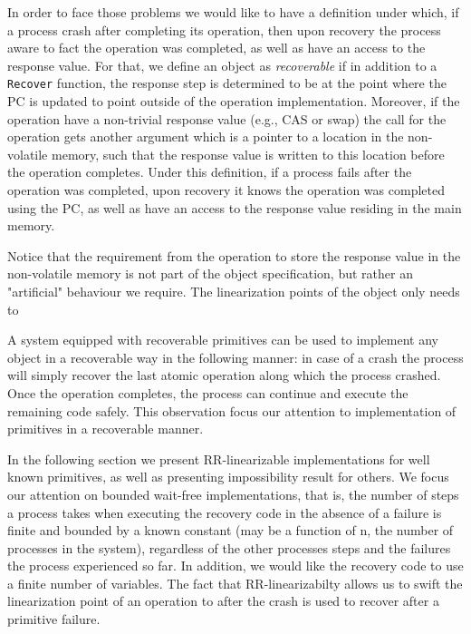 In order to face those problems we would like to have a definition under which, if a process crash after completing its operation, then upon recovery the process aware to fact the operation was completed, as well as have an access to the response value. For that, we define an object as \textit{recoverable} if in addition to a \texttt{Recover} function, the response step is determined to be at the point where the PC is updated to point outside of the operation implementation. Moreover, if the operation have a non-trivial response value (e.g., CAS or swap) the call for the operation gets another argument which is a pointer to a location in the non-volatile memory, such that the response value is written to this location before the operation completes.
Under this definition, if a process fails after the operation was completed, upon recovery it knows the operation was completed using the PC, as well as have an access to the response value residing in the main memory.

Notice that the requirement from the operation to store the response value in the non-volatile memory is not part of the object specification, but rather an "artificial" behaviour we require. The linearization points of the object only needs to 






A system equipped with recoverable primitives can be used to implement any object in a recoverable way in the following manner: in case of a crash the process will simply recover the last atomic operation along which the process crashed. Once the operation completes, the process can continue and execute the remaining code safely. This observation focus our attention to implementation of primitives in a recoverable manner.

In the following section we present RR-linearizable implementations for well known primitives, as well as presenting impossibility result for others. We focus our attention on bounded wait-free implementations, that is, the number of steps a process takes when executing the recovery code in the absence of a failure is finite and bounded by a known constant (may be a function of n, the number of processes in the system), regardless of the other processes steps and the failures the process experienced so far. In addition, we would like the recovery code to use a finite number of variables.
The fact that RR-linearizabilty allows us to swift the linearization point of an operation to after the crash is used to recover after a primitive failure.

